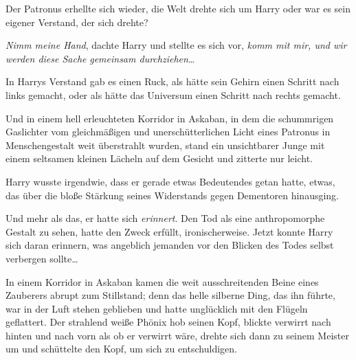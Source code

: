 Der Patronus erhellte sich wieder, die Welt drehte sich um Harry oder war es sein eigener Verstand, der sich drehte?

\emph{Nimm meine Hand}, dachte Harry und stellte es sich vor, \emph{komm mit mir, und wir werden diese Sache} \emph{gemeinsam durchziehen}…

In Harrys Verstand gab es einen Ruck, als hätte sein Gehirn einen Schritt nach links gemacht, oder als hätte das Universum einen Schritt nach rechts gemacht.

Und in einem hell erleuchteten Korridor in Askaban, in dem die schummrigen Gaslichter vom gleichmäßigen und unerschütterlichen Licht eines Patronus in Menschengestalt weit überstrahlt wurden, stand ein unsichtbarer Junge mit einem seltsamen kleinen Lächeln auf dem Gesicht und zitterte nur leicht.

Harry wusste irgendwie, dass er gerade etwas Bedeutendes getan hatte, etwas, das über die bloße Stärkung seines Widerstands gegen Dementoren hinausging.

Und mehr als das, er hatte sich \emph{erinnert}. Den Tod als eine anthropomorphe Gestalt zu sehen, hatte den Zweck erfüllt, ironischerweise. Jetzt konnte Harry sich daran erinnern, was angeblich jemanden vor den Blicken des Todes selbst verbergen sollte…

\later

In einem Korridor in Askaban kamen die weit ausschreitenden Beine eines Zauberers abrupt zum Stillstand; denn das helle silberne Ding, das ihn führte, war in der Luft stehen geblieben und hatte unglücklich mit den Flügeln geflattert. Der strahlend weiße Phönix hob seinen Kopf, blickte verwirrt nach hinten und nach vorn als ob er verwirrt wäre, drehte sich dann zu seinem Meister um und schüttelte den Kopf, um sich zu entschuldigen.

